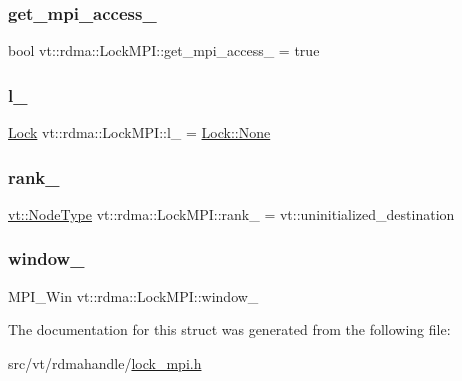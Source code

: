 \subsubsection{\texorpdfstring{get\+\_\+mpi\+\_\+access\+\_\+}{get\_mpi\_access\_}}
{\footnotesize\ttfamily bool vt\+::rdma\+::\+Lock\+M\+P\+I\+::get\+\_\+mpi\+\_\+access\+\_\+ = true\hspace{0.3cm}{\ttfamily [private]}}

\mbox{\label{structvt_1_1rdma_1_1_lock_m_p_i_a5f2df5bc35976f1e84e806b0346a3680}} 
\subsubsection{\texorpdfstring{l\+\_\+}{l\_}}
{\footnotesize\ttfamily \hyperlink{namespacevt_1_1rdma_ac5c20b41a653e520b6305d4d454ecb70}{Lock} vt\+::rdma\+::\+Lock\+M\+P\+I\+::l\+\_\+ = \hyperlink{namespacevt_1_1rdma_ac5c20b41a653e520b6305d4d454ecb70a6adf97f83acf6453d4a6a4b1070f3754}{Lock\+::\+None}\hspace{0.3cm}{\ttfamily [private]}}

\mbox{\label{structvt_1_1rdma_1_1_lock_m_p_i_a3f0c17bedbb2630d78cff51ba4c096ae}} 
\subsubsection{\texorpdfstring{rank\+\_\+}{rank\_}}
{\footnotesize\ttfamily \hyperlink{namespacevt_a866da9d0efc19c0a1ce79e9e492f47e2}{vt\+::\+Node\+Type} vt\+::rdma\+::\+Lock\+M\+P\+I\+::rank\+\_\+ = vt\+::uninitialized\+\_\+destination\hspace{0.3cm}{\ttfamily [private]}}

\mbox{\label{structvt_1_1rdma_1_1_lock_m_p_i_a641c0b10028472abe859317c94a1c511}} 
\subsubsection{\texorpdfstring{window\+\_\+}{window\_}}
{\footnotesize\ttfamily M\+P\+I\+\_\+\+Win vt\+::rdma\+::\+Lock\+M\+P\+I\+::window\+\_\+\hspace{0.3cm}{\ttfamily [private]}}



The documentation for this struct was generated from the following file\+:\begin{DoxyCompactItemize}
\item 
src/vt/rdmahandle/\hyperlink{lock__mpi_8h}{lock\+\_\+mpi.\+h}\end{DoxyCompactItemize}
